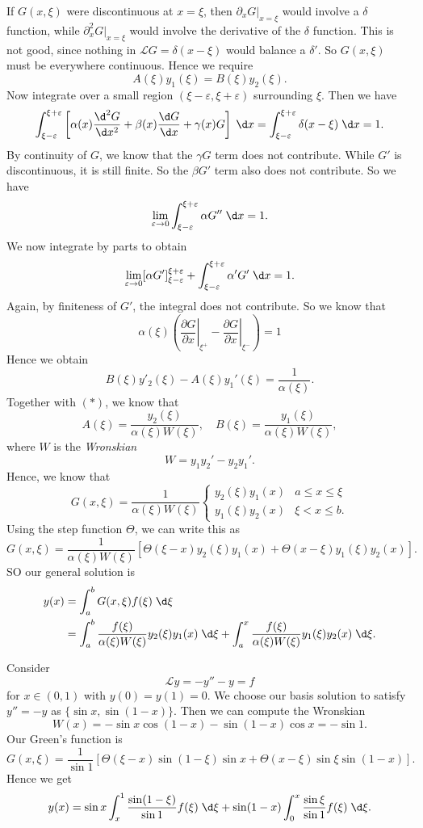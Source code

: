 \documentclass[a4paper]{article}
\begin{document}
If $G(x, \xi)$ were discontinuous at $x = \xi$, then $\partial_x G|_{x = \xi}$ would involve a $\delta$ function, while $\partial^2_x G|_{x = \xi}$ would involve the derivative of the $\delta$ function. This is not good, since nothing in $\mathcal{L}G = \delta(x - \xi)$ would balance a $\delta'$. So $G(x, \xi)$ must be everywhere continuous. Hence we require
\[
  A(\xi) y_1 (\xi) = B(\xi) y_2(\xi).\tag{$*$}
\]
Now integrate over a small region $(\xi - \varepsilon, \xi + \varepsilon)$ surrounding $\xi$. Then we have
\[
  \int_{\xi - \varepsilon}^{\xi + \varepsilon} \left[\alpha(x) \frac{\d^2 G}{\d x^2} + \beta(x) \frac{\d G}{\d x} + \gamma(x) G\right]\;\d x = \int_{\xi - \varepsilon}^{\xi + \varepsilon} \delta(x - \xi)\;\d x = 1.
\]
By continuity of $G$, we know that the $\gamma G$ term does not contribute. While $G'$ is discontinuous, it is still finite. So the $\beta G'$ term also does not contribute. So we have
\[
  \lim_{\varepsilon \to 0} \int_{\xi - \varepsilon}^{\xi + \varepsilon} \alpha G'' \;\d x = 1.
\]
We now integrate by parts to obtain
\[
  \lim_{\varepsilon \to 0} [\alpha G']^{\xi + \varepsilon}_{\xi - \varepsilon} + \int_{\xi - \varepsilon}^{\xi + \varepsilon} \alpha' G' \;\d x = 1.
\]
Again, by finiteness of $G'$, the integral does not contribute. So we know that
\[
  \alpha(\xi)\left(\left.\frac{\partial G}{\partial x}\right|_{\xi^+} - \left.\frac{\partial G}{\partial x}\right|_{\xi^-}\right) = 1
\]
Hence we obtain
\[
  B(\xi) y'_2 (\xi) - A(\xi) y_1'(\xi) = \frac{1}{\alpha(\xi)}.
\]
Together with $(*)$, we know that
\[
  A(\xi) = \frac{y_2(\xi)}{\alpha(\xi) W(\xi)},\quad B(\xi) = \frac{y_1(\xi)}{\alpha(\xi)W(\xi)},
\]
where $W$ is the \emph{Wronskian}
\[
  W = y_1 y_2' - y_2y_1'.
\]
Hence, we know that
\[
  G(x, \xi) = \frac{1}{\alpha(\xi)W(\xi)}
  \begin{cases}
    y_2(\xi) y_1(x) & a \leq x \leq \xi\\
    y_1(\xi) y_2(x) & \xi < x \leq b.
  \end{cases}
\]
Using the step function $\Theta$, we can write this as
\[
  G(x, \xi) = \frac{1}{\alpha(\xi)W(\xi)} [\Theta (\xi - x) y_2(\xi)y_1(x) + \Theta(x - \xi)y_1(\xi)y_2(x)].
\]
SO our general solution is
\begin{align*}
  y(x) &= \int_a^b G(x, \xi) f(\xi)\;\d \xi\\
  &= \int_a^b \frac{f(\xi)}{\alpha(\xi)W(\xi)} y_2(\xi) y_1(x)\;\d \xi + \int_a^x \frac{f(\xi)}{\alpha(\xi)W(\xi)}y_1(\xi) y_2(x)\;\d \xi.
\end{align*}

\begin{eg}
  Consider
  \[
    \mathcal{L}y= -y'' - y = f
  \]
  for $x \in (0, 1)$ with $y(0) = y(1) = 0$. We choose our basis solution to satisfy $y'' = -y$ as $\{\sin x, \sin (1 - x)\}$. Then we can compute the Wronskian
  \[
    W(x) = -\sin x \cos(1 - x) - \sin (1 - x) \cos x = -\sin 1.
  \]
  Our Green's function is
  \[
    G(x, \xi) = \frac{1}{\sin 1}[\Theta(\xi - x) \sin (1 - \xi) \sin x + \Theta(x - \xi) \sin \xi \sin (1 - x)].
  \]
  Hence we get
  \[
    y(x) = \sin x \int_{x}^1 \frac{\sin (1 - \xi)}{ \sin 1}f(\xi) \;\d \xi + \sin(1 - x)\int_0^x \frac{\sin \xi}{\sin 1}f(\xi)\;\d \xi.
  \]
\end{eg}
\end{document}
